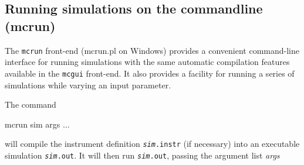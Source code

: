 \subsection{Running simulations on the commandline (mcrun)}
\label{s:mcrun}

The \verb+mcrun+ front-end (mcrun.pl on Windows) provides a convenient
command-line interface for running simulations with the same automatic
compilation features available in the \verb+mcgui+ front-end. It also provides a
facility for running a series of simulations while varying an input parameter.

The command

\begin{bash}
mcrun sim args ...
\end{bash}

will compile the instrument definition \texttt{{\it sim}.instr} (if
necessary) into an executable simulation \texttt{{\it sim}.out}. It
will then run \texttt{{\it sim}.out}, passing the argument list {\it
  args}

